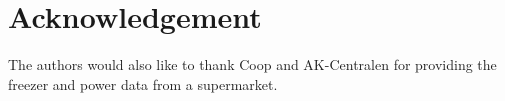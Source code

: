 \section*{Acknowledgement}

The authors would also like to thank Coop and AK-Centralen for providing the freezer and power data from a supermarket.

